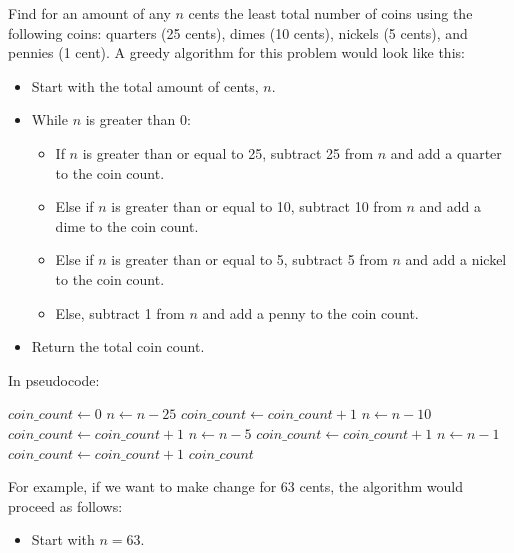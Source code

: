 \begin{eg}
    Find for an amount of any $n$ cents the least total number of coins using the following coins: quarters (25 cents), dimes (10 cents), nickels (5 cents), and pennies (1 cent). A greedy algorithm for this problem would look like this:
    \begin{itemize}[itemsep=1pt,label=$\circ$]
        \item Start with the total amount of cents, $n$.
        \item While $n$ is greater than 0:
        \begin{itemize}[itemsep=1pt,label=$\circ$]
            \item If $n$ is greater than or equal to 25, subtract 25 from $n$ and add a quarter to the coin count.
            \item Else if $n$ is greater than or equal to 10, subtract 10 from $n$ and add a dime to the coin count.
            \item Else if $n$ is greater than or equal to 5, subtract 5 from $n$ and add a nickel to the coin count.
            \item Else, subtract 1 from $n$ and add a penny to the coin count.
        \end{itemize}
        \item Return the total coin count.
    \end{itemize}
    In pseudocode:
    \begin{algorithmic}
            \State $coin\_count \gets 0$
                    \State $n \gets n - 25$
                    \State $coin\_count \gets coin\_count + 1$
                    \State $n \gets n - 10$
                    \State $coin\_count \gets coin\_count + 1$
                    \State $n \gets n - 5$
                    \State $coin\_count \gets coin\_count + 1$
                \Else
                    \State $n \gets n - 1$
                    \State $coin\_count \gets coin\_count + 1$
                \EndIf
            \EndWhile
            \State \Return $coin\_count$
        \EndFunction
    \end{algorithmic}
    For example, if we want to make change for 63 cents, the algorithm would proceed as follows:
    \begin{itemize}[itemsep=1pt,label=$\circ$]
        \item Start with $n = 63$.

\end{itemize}
\end{eg}
